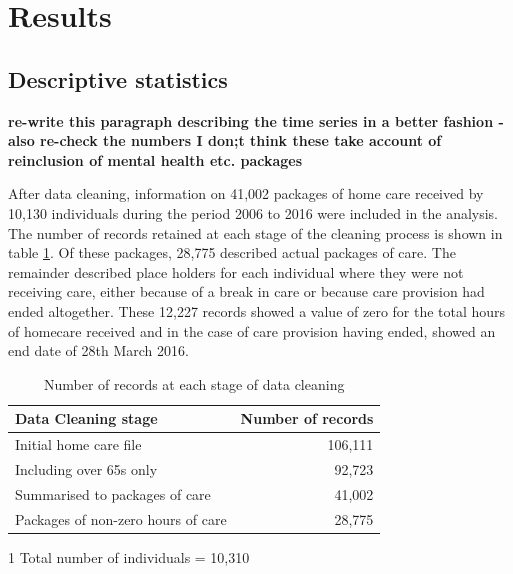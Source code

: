 \documentclass[]{article}
\begin{document}
\FloatBarrier

\section{Results}\label{sec:renf-results}

\subsection{Descriptive statistics}\label{subsec:renf-descriptives}

\textbf{re-write this paragraph describing the time series in a better
fashion - also re-check the numbers I don;t think these take account of
reinclusion of mental health etc. packages}

After data cleaning, information on 41,002 packages of home care
received by 10,130 individuals during the period 2006 to 2016 were
included in the analysis. The number of records retained at each stage
of the cleaning process is shown in table \ref{tab:renf-cleaning}. Of
these packages, 28,775 described actual packages of care. The remainder
described place holders for each individual where they were not
receiving care, either because of a break in care or because care
provision had ended altogether. These 12,227 records showed a value of
zero for the total hours of homecare received and in the case of care
provision having ended, showed an end date of 28th March 2016.

\begin{table}[h]
\centering
\begin{threeparttable}
\begin{tabular}{@{}lr@{}}
\toprule
Data Cleaning stage                & Number of records \\ \midrule
Initial home care file             & 106,111           \\
Including over 65s only            & 92,723             \\
Summarised to packages of care     & 41,002\tnote{1}    \\ 
Packages of non-zero hours of care & 28,775             \\ \bottomrule
\end{tabular}
\begin{tablenotes}
\item[1] Total number of individuals = 10,310
\end{tablenotes}
\end{threeparttable}
\caption{Number of records at each stage of data cleaning}
\label{tab:renf-cleaning}
\end{table}
\end{document}
